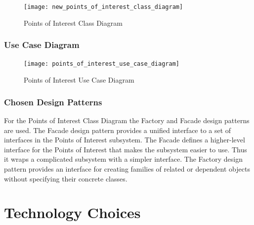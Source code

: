 \documentclass{article}
\begin{document}
	  \begin{figure}[H]
            \centering
            \texttt{[image: new\_points\_of\_interest\_class\_diagram]}
            \caption{Points of Interest Class Diagram}
            \label{Points of Interest Class Diagram}
        \end{figure}

        \subsubsection{Use Case Diagram}

	 \begin{figure}[H]
            \centering
            \texttt{[image: points\_of\_interest\_use\_case\_diagram]}
            \caption{Points of Interest Use Case Diagram}
            \label{Points of Interest Use Case Diagram}
        \end{figure}

        \subsubsection{Chosen Design Patterns}

	 For the Points of Interest Class Diagram the Factory and Facade design patterns are used. The Facade design pattern provides a unified interface to a set of interfaces in the Points of Interest subsystem. The Facade defines a higher-level interface for the Points of Interest that makes the subsystem easier to use. Thus it wraps a complicated subsystem with a simpler interface. The Factory design pattern provides an interface for creating families of related or dependent objects without specifying their concrete classes.

\newpage
\section{Technology Choices}

\end{document}

